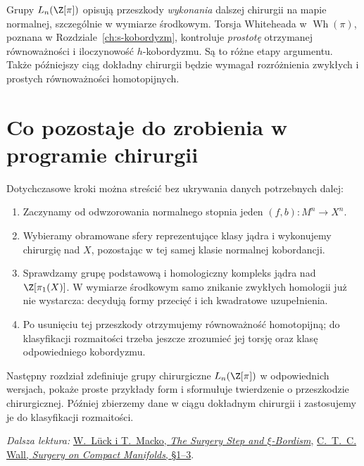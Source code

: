 \begin{uwaga}
Grupy $L_n(\Z[\pi])$ opisują przeszkody
\emph{wykonania} dalszej chirurgii na mapie
normalnej, szczególnie w wymiarze środkowym.
Torsja Whiteheada w
$\operatorname{Wh}(\pi)$, poznana w
Rozdziale~\ref{ch:s-kobordyzm}, kontroluje
\emph{prostotę} otrzymanej równoważności
i iloczynowość $h$-kobordyzmu.
Są to różne etapy argumentu. Także późniejszy
ciąg dokładny chirurgii będzie wymagał
rozróżnienia zwykłych i prostych
równoważności homotopijnych.
\end{uwaga}

\section{Co pozostaje do zrobienia w programie chirurgii}
\label{sec:plan-chirurgia-21}

Dotychczasowe kroki można streścić bez
ukrywania danych potrzebnych dalej:
\begin{enumerate}[label=(\arabic*)]
\item Zaczynamy od odwzorowania normalnego
stopnia jeden $(f,b):M^n\to X^n$.
\item Wybieramy obramowane sfery reprezentujące
klasy jądra i wykonujemy chirurgię nad $X$,
pozostając w tej samej klasie normalnej kobordancji.
\item Sprawdzamy grupę podstawową i homologiczny
kompleks jądra nad $\Z[\pi_1(X)]$.
W wymiarze środkowym samo znikanie zwykłych
homologii już nie wystarcza: decydują formy
przecięć i ich kwadratowe uzupełnienia.
\item Po usunięciu tej przeszkody otrzymujemy
równoważność homotopijną; do klasyfikacji
rozmaitości trzeba jeszcze zrozumieć
jej torsję oraz klasę odpowiedniego
kobordyzmu.
\end{enumerate}

Następny rozdział zdefiniuje grupy chirurgiczne
$L_n(\Z[\pi])$ w odpowiednich wersjach,
pokaże proste przykłady form i sformułuje
twierdzenie o przeszkodzie chirurgicznej.
Później zbierzemy dane w ciągu dokładnym
chirurgii i zastosujemy je do klasyfikacji
rozmaitości.

\par\smallskip
{\footnotesize\noindent\emph{Dalsza lektura:}
\href{https://link.springer.com/chapter/10.1007/978-3-031-56334-8_4}
{W.~Lück i T.~Macko, \emph{The Surgery Step and $\xi$-Bordism}},
\href{https://webhomes.maths.ed.ac.uk/~v1ranick/books/scm.pdf}
{C.~T.~C. Wall, \emph{Surgery on Compact Manifolds}, §1--3}.\par}
